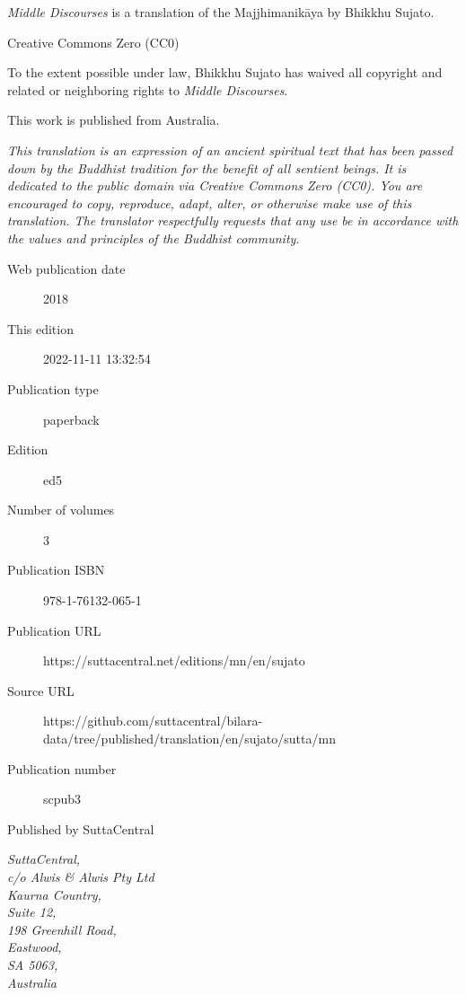 \documentclass[12pt,openany]{book}%
\begin{document}
\begin{footnotesize}

\textit{Middle Discourses} is a translation of the Majjhimanikāya by Bhikkhu Sujato.

\medskip

Creative Commons Zero (CC0)

To the extent possible under law, Bhikkhu Sujato has waived all copyright and related or neighboring rights to \textit{Middle Discourses}.

\medskip

This work is published from Australia.

\begin{center}
\textit{This translation is an expression of an ancient spiritual text that has been passed down by the Buddhist tradition for the benefit of all sentient beings. It is dedicated to the public domain via Creative Commons Zero (CC0). You are encouraged to copy, reproduce, adapt, alter, or otherwise make use of this translation. The translator respectfully requests that any use be in accordance with the values and principles of the Buddhist community.}
\end{center}

\medskip

\begin{description}
    \item[Web publication date] 2018
    \item[This edition] 2022-11-11 13:32:54
    \item[Publication type] paperback
    \item[Edition] ed5
    \item[Number of volumes] 3
    \item[Publication ISBN] 978-1-76132-065-1
    \item[Publication URL] https://suttacentral.net/editions/mn/en/sujato
    \item[Source URL] https://github.com/suttacentral/bilara-data/tree/published/translation/en/sujato/sutta/mn
    \item[Publication number] scpub3
\end{description}

\medskip

Published by SuttaCentral

\medskip

\textit{SuttaCentral,\\
c/o Alwis \& Alwis Pty Ltd\\
Kaurna Country,\\
Suite 12,\\
198 Greenhill Road,\\
Eastwood,\\
SA 5063,\\
Australia}

\end{footnotesize}
\end{document}
